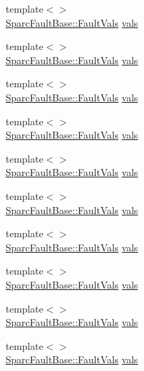 \begin{DoxyCompactItemize}
{\footnotesize template$<$$>$ }\\\hyperlink{structSparcISA_1_1SparcFaultBase_1_1FaultVals}{SparcFaultBase::FaultVals} \hyperlink{classSparcISA_1_1SparcFault_a88174a6ce260cacb323e0d78465e4c52}{vals}
\item 
{\footnotesize template$<$$>$ }\\\hyperlink{structSparcISA_1_1SparcFaultBase_1_1FaultVals}{SparcFaultBase::FaultVals} \hyperlink{classSparcISA_1_1SparcFault_a88174a6ce260cacb323e0d78465e4c52}{vals}
\item 
{\footnotesize template$<$$>$ }\\\hyperlink{structSparcISA_1_1SparcFaultBase_1_1FaultVals}{SparcFaultBase::FaultVals} \hyperlink{classSparcISA_1_1SparcFault_a88174a6ce260cacb323e0d78465e4c52}{vals}
\item 
{\footnotesize template$<$$>$ }\\\hyperlink{structSparcISA_1_1SparcFaultBase_1_1FaultVals}{SparcFaultBase::FaultVals} \hyperlink{classSparcISA_1_1SparcFault_a88174a6ce260cacb323e0d78465e4c52}{vals}
\item 
{\footnotesize template$<$$>$ }\\\hyperlink{structSparcISA_1_1SparcFaultBase_1_1FaultVals}{SparcFaultBase::FaultVals} \hyperlink{classSparcISA_1_1SparcFault_a88174a6ce260cacb323e0d78465e4c52}{vals}
\item 
{\footnotesize template$<$$>$ }\\\hyperlink{structSparcISA_1_1SparcFaultBase_1_1FaultVals}{SparcFaultBase::FaultVals} \hyperlink{classSparcISA_1_1SparcFault_a88174a6ce260cacb323e0d78465e4c52}{vals}
\item 
{\footnotesize template$<$$>$ }\\\hyperlink{structSparcISA_1_1SparcFaultBase_1_1FaultVals}{SparcFaultBase::FaultVals} \hyperlink{classSparcISA_1_1SparcFault_a88174a6ce260cacb323e0d78465e4c52}{vals}
\item 
{\footnotesize template$<$$>$ }\\\hyperlink{structSparcISA_1_1SparcFaultBase_1_1FaultVals}{SparcFaultBase::FaultVals} \hyperlink{classSparcISA_1_1SparcFault_a88174a6ce260cacb323e0d78465e4c52}{vals}
\item 
{\footnotesize template$<$$>$ }\\\hyperlink{structSparcISA_1_1SparcFaultBase_1_1FaultVals}{SparcFaultBase::FaultVals} \hyperlink{classSparcISA_1_1SparcFault_a88174a6ce260cacb323e0d78465e4c52}{vals}
\item 
{\footnotesize template$<$$>$ }\\\hyperlink{structSparcISA_1_1SparcFaultBase_1_1FaultVals}{SparcFaultBase::FaultVals} \hyperlink{classSparcISA_1_1SparcFault_a88174a6ce260cacb323e0d78465e4c52}{vals}

\end{DoxyCompactItemize}

